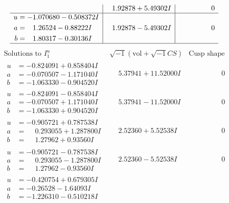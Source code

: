 \documentclass[1p]{elsarticle_modified}
\theoremstyle{definition}
\newcommand{\I}{\sqrt{-1}}
\begin{document}
$$\begin{array}{c|c|c}
 & \phantom{-}1.92878 + 5.49302 I & \phantom{-0.000000 } 0 \\ \hline\begin{aligned}
u &= -1.070680 - 0.508372 I \\
a &= \phantom{-}1.26524 - 0.88222 I \\
b &= \phantom{-}1.80317 - 0.30136 I\end{aligned}
 & \phantom{-}1.92878 - 5.49302 I & \phantom{-0.000000 } 0\\
 \hline 
 \end{array}$$\newpage$$\begin{array}{c|c|c}  
\text{Solutions to }I^u_{1}& \I (\text{vol} + \sqrt{-1}CS) & \text{Cusp shape}\\
 \hline 
\begin{aligned}
u &= -0.824091 + 0.858404 I \\
a &= -0.070507 - 1.171040 I \\
b &= -1.063330 - 0.904520 I\end{aligned}
 & \phantom{-}5.37941 + 11.52000 I & \phantom{-0.000000 } 0 \\ \hline\begin{aligned}
u &= -0.824091 - 0.858404 I \\
a &= -0.070507 + 1.171040 I \\
b &= -1.063330 + 0.904520 I\end{aligned}
 & \phantom{-}5.37941 - 11.52000 I & \phantom{-0.000000 } 0 \\ \hline\begin{aligned}
u &= -0.905721 + 0.787538 I \\
a &= \phantom{-}0.293055 + 1.287800 I \\
b &= \phantom{-}1.27962 + 0.93560 I\end{aligned}
 & \phantom{-}2.52360 + 5.52538 I & \phantom{-0.000000 } 0 \\ \hline\begin{aligned}
u &= -0.905721 - 0.787538 I \\
a &= \phantom{-}0.293055 - 1.287800 I \\
b &= \phantom{-}1.27962 - 0.93560 I\end{aligned}
 & \phantom{-}2.52360 - 5.52538 I & \phantom{-0.000000 } 0 \\ \hline\begin{aligned}
u &= -0.420754 + 0.679305 I \\
a &= -0.26528 - 1.64093 I \\
b &= -1.226310 - 0.510218 I\end{aligned}

\end{array}$$
\end{document}
